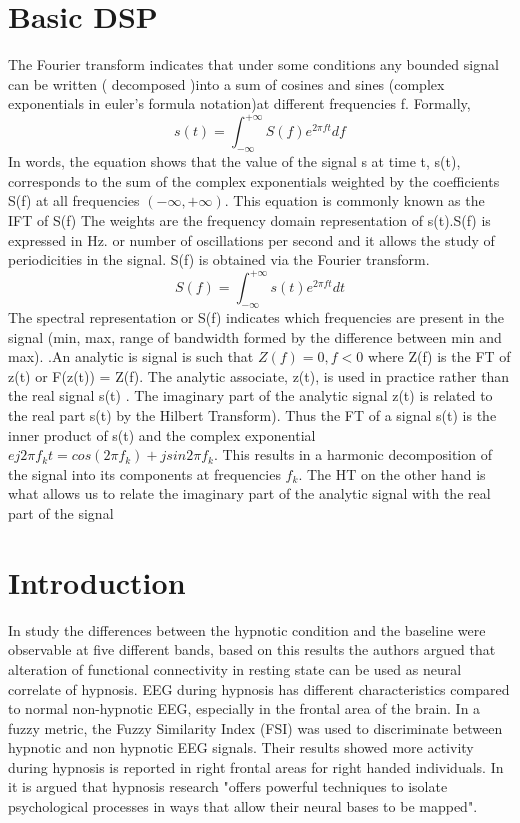 \documentclass[11pt, onecolumn]{article}
\begin{document}
\section{Basic DSP}
The Fourier transform indicates that under some conditions any bounded signal can be written ( decomposed )into a sum of cosines and sines (complex exponentials in euler's formula notation)at different frequencies f.
Formally,
\begin{equation}
s(t) = \int_{-\infty}^{+\infty} S(f)e^{2 \pi f t} df
\end{equation}
In words, the equation shows that the value of the signal s at time t, s(t), corresponds to the sum of the complex exponentials weighted by the coefficients S(f) at all frequencies $(-\infty, +\infty)$. This equation is commonly known as the IFT of S(f) The weights are the frequency domain representation of s(t).S(f) is expressed in Hz. or number of oscillations per second and it allows the study of periodicities in the signal. S(f) is obtained via the Fourier transform.
\begin{equation}
S(f) = \int_{-\infty}^{+\infty} s(t)e^{2 \pi f t} dt
\end{equation}
The spectral representation or S(f) indicates which frequencies are present in the signal (min, max, range of bandwidth formed by the difference between min and max). .An analytic is signal is such that $Z(f) = 0, f < 0$
where Z(f) is the FT of z(t) or F(z(t)) = Z(f). The analytic
associate, z(t), is used in practice rather than the real signal s(t) . The imaginary part of the analytic signal z(t) is related to the real part s(t) by the Hilbert Transform).
Thus the FT of a signal s(t) is the inner product of s(t) and the complex exponential $e j 2 \pi f_k t = cos (2 \pi f_k ) + j sin 2 \pi f_k $. This results in a harmonic decomposition of the signal into its components at frequencies $f_k$. The HT on the other hand is what allows us to relate the imaginary part of the analytic signal with the real part of the signal

\section{Introduction}
\label{se:intro}
In \citep{fingelkurts_cortex_2007} study the differences between the hypnotic condition and the baseline were observable at five different bands, based on this results the authors argued that alteration of functional connectivity in resting state can be used as neural correlate of hypnosis. 
EEG during hypnosis has different characteristics compared to normal non-hypnotic EEG, especially in the frontal area of the brain. In  \citep{behbahani_relation_2013} a fuzzy metric, the Fuzzy Similarity Index (FSI) was used to discriminate between hypnotic and non hypnotic EEG signals. Their results showed more activity during hypnosis is reported in right frontal areas for right handed individuals.
In \citep{barnier_hypnosis_2003} it is argued that hypnosis research "offers powerful techniques to isolate psychological
processes in ways that allow their neural bases to be mapped".
\end{document}
